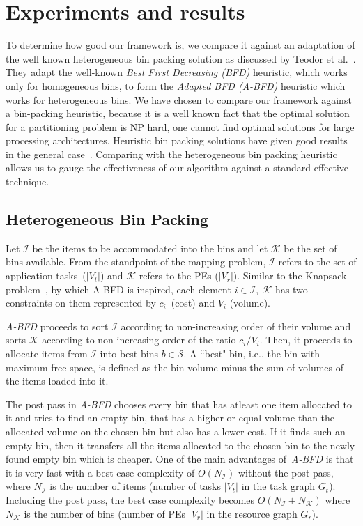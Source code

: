 \section{Experiments and results}
\label{sec:experiments-results}

To determine how good our framework is, we compare it against an
adaptation of the well known heterogeneous bin packing solution as
discussed by Teodor et al.~\cite{tcra11}. They adapt the well-known
\textit{Best First Decreasing (BFD)} heuristic, which works only for
homogeneous bins, to form the \textit{Adapted BFD (A-BFD)} heuristic
which works for heterogeneous bins. We have chosen to compare our
framework against a bin-packing heuristic, because it is a well known
fact that the optimal solution for a partitioning problem is NP hard,
one cannot find optimal solutions for large processing
architectures. Heuristic bin packing solutions have given good results
in the general case~\cite{ecof78}. Comparing with the heterogeneous bin
packing heuristic allows us to gauge the effectiveness of our algorithm
against a standard effective technique.

\subsection{Heterogeneous Bin Packing}

Let $\mathcal{I}$ be the items to be accommodated into the bins and let
$\mathcal{K}$ be the set of bins available.  From the standpoint of the
mapping problem, $\mathcal{I}$ refers to the set of
\mbox{application-tasks ($|V_t|$)} and $\mathcal{K}$ refers to the PEs
($|V_r|$). Similar to the Knapsack problem~\cite{sski08}, by which A-BFD
is inspired, each element $i \in \mathcal{I},\ \mathcal{K}$ has two
constraints on them represented by \mbox{$c_i$ (cost)} and $V_i$
(volume).

\textit{A-BFD} proceeds to sort $\mathcal{I}$ according to
non-increasing order of their volume and sorts $\mathcal{K}$ according
to non-increasing order of the ratio $c_i/V_i$. Then, it proceeds to
allocate items from $\mathcal{I}$ into best bins $b \in \mathcal{S}$. A
``best" bin, i.e., the bin with maximum free space, is defined as the
bin volume minus the sum of volumes of the items loaded into
it.

The post pass in \textit{A-BFD} chooses every bin that has atleast one
item allocated to it and tries to find an empty bin, that has a higher
or equal volume than the allocated volume on the chosen bin but also has
a lower cost. If it finds such an empty bin, then it transfers all the
items allocated to the chosen bin to the newly found empty bin which is
cheaper. One of the main advantages of\ \textit{A-BFD} is that it is
very fast with a best case complexity of $O(N_\mathcal{I})$ without the
post pass, where $N_\mathcal{I}$ is the number of items (number of tasks
$|V_t|$ in the task graph $G_t$). Including the post pass, the best case
complexity becomes $O(N_\mathcal{I} + N_\mathcal{K})$ where
$N_\mathcal{K}$ is the number of bins (number of PEs $|V_r|$ in the
resource graph $G_r$).

